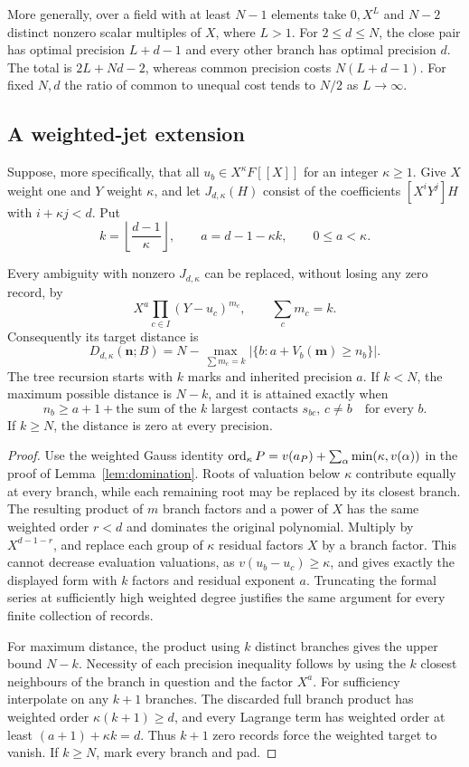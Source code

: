 More generally, over a field with at least $N-1$ elements take
$0,X^L$ and $N-2$ distinct nonzero scalar multiples of $X$, where $L>1$.
For $2\le d\le N$, the close pair has optimal precision $L+d-1$ and every
other branch has optimal precision $d$. The total is
$2L+Nd-2$, whereas common precision costs $N(L+d-1)$.
For fixed $N,d$ the ratio of common to unequal cost tends to $N/2$ as
$L\to\infty$.

\subsection{A weighted-jet extension}

Suppose, more specifically, that all $u_b\in X^\kappa F[[X]]$ for an integer
$\kappa\ge1$. Give $X$ weight one and $Y$ weight $\kappa$, and let
$J_{d,\kappa}(H)$ consist of the coefficients $[X^iY^j]H$ with
$i+\kappa j<d$. Put
\[
 k=\left\lfloor\frac{d-1}{\kappa}\right\rfloor,
 \qquad a=d-1-\kappa k,\qquad 0\le a<\kappa.
\]

\begin{corollary}\label{cor:weighted}
Every ambiguity with nonzero $J_{d,\kappa}$ can be replaced, without losing
any zero record, by
\[
 X^a\prod_{c\in I}(Y-u_c)^{m_c},\qquad \sum_cm_c=k.
\]
Consequently its target distance is
\[
 D_{d,\kappa}(\mathbf n;B)=
 N-\max_{\sum m_c=k}|\{b:a+V_b(\mathbf m)\ge n_b\}|.
\]
The tree recursion starts with $k$ marks and inherited precision $a$.
If $k<N$, the maximum possible distance is $N-k$, and it is attained exactly
when
\[
 n_b\ge a+1+\text{the sum of the $k$ largest contacts $s_{bc}$, $c\ne b$}
 \quad\text{for every }b.
\]
If $k\ge N$, the distance is zero at every precision.
\end{corollary}

\begin{proof}
Use the weighted Gauss identity
$\operatorname{ord}_\kappa P=v(a_P)+\sum_\alpha\min(\kappa,v(\alpha))$
in the proof of Lemma~\ref{lem:domination}. Roots of valuation below
$\kappa$ contribute equally at every branch, while each remaining root may
be replaced by its closest branch. The resulting product of $m$ branch
factors and a power of $X$ has the same weighted order $r<d$ and dominates
the original polynomial. Multiply by $X^{d-1-r}$, and replace each group
of $\kappa$ residual factors $X$ by a branch factor. This cannot decrease
evaluation valuations, as $v(u_b-u_c)\ge\kappa$, and gives exactly the
displayed form with $k$ factors and residual exponent $a$. Truncating the
formal series at sufficiently high weighted degree justifies the same
argument for every finite collection of records.

For maximum distance, the product using $k$ distinct branches gives the
upper bound $N-k$. Necessity of each precision inequality follows by using
the $k$ closest neighbours of the branch in question and the factor $X^a$.
For sufficiency interpolate on any $k+1$ branches. The discarded full branch
product has weighted order $\kappa(k+1)\ge d$, and every Lagrange term has
weighted order at least $(a+1)+\kappa k=d$. Thus $k+1$ zero records force
the weighted target to vanish. If $k\ge N$, mark every branch and pad.
\end{proof}

